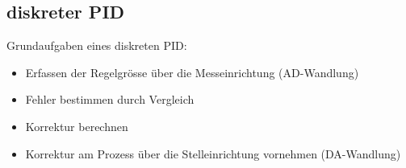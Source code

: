 \subsection{diskreter PID }
  Grundaufgaben eines diskreten PID:
  \begin{itemize}
    \item Erfassen der Regelgrösse über die Messeinrichtung (AD-Wandlung)
    \item Fehler bestimmen durch Vergleich
    \item Korrektur berechnen
    \item Korrektur am Prozess über die Stelleinrichtung vornehmen (DA-Wandlung)
  \end{itemize}

	